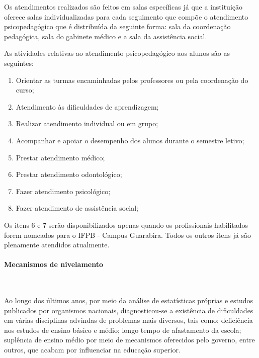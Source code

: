 
       Os atendimentos realizados são feitos em salas específicas já que a instituição oferece salas individualizadas para cada seguimento que compõe o atendimento psicopedagógico que é distribuída da seguinte forma: sala da coordenação pedagógica, sala do gabinete médico e a sala da assistência social. 

       As atividades relativas ao atendimento psicopedagógico aos alunos são as seguintes:

\begin{enumerate}
\item Orientar as turmas encaminhadas pelos professores ou pela coordenação do curso; 
\item Atendimento às dificuldades de aprendizagem;
\item Realizar atendimento individual ou em grupo;
\item Acompanhar e apoiar o desempenho dos alunos durante o semestre letivo;
\item Prestar atendimento médico;
\item Prestar atendimento odontológico;
\item Fazer atendimento psicológico;
\item Fazer atendimento de assistência social;
\end{enumerate}

	Os itens 6 e 7 ser\~ao disponibilizados apenas quando os profissionais habilitados forem nomeados para o IFPB - Campus Guarabira. Todos os outros \'itens j\'a s\~ao plenamente atendidos atualmente.

\paragraph{Mecanismos de nivelamento}\

Ao longo dos últimos anos, por meio da análise de estatísticas próprias e estudos publicados por organismos nacionais, diagnosticou-se a existência de dificuldades em várias disciplinas advindas de problemas mais diversos, tais como: deficiência nos estudos de ensino básico e médio; longo tempo de afastamento da escola; suplência de ensino médio por meio de mecanismos oferecidos pelo governo, entre outros, que acabam por influenciar na educação superior.

